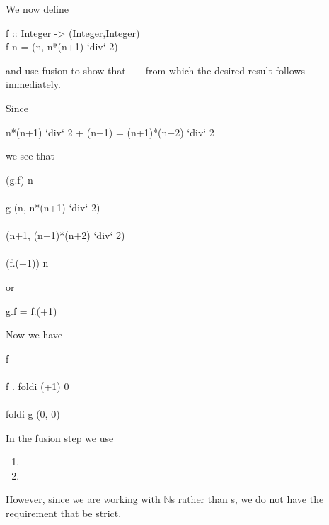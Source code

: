 \documentclass{seminar}
\newcommand{\NAT}{\textcolor{MathColor}{\ensuremath{\mathbb{N}}}}
\begin{document}
\begin{slide}
We now define

\begin{code}
f :: Integer -> (Integer,Integer)\\
f n = (n, n*(n+1) `div` 2)
\end{code}

and use fusion to show that ~  ~ from which the
desired result follows immediately.

\newslide


Since

\begin{code}
n*(n+1) `div` 2 + (n+1) = (n+1)*(n+2) `div` 2
\end{code}

we see that

\begin{code}
(g.f) n\\
\\
g (n, n*(n+1) `div` 2)\\
\\
(n+1, (n+1)*(n+2) `div` 2)\\
\\
(f.(+1)) n
\end{code}

or

\begin{code}
g.f = f.(+1)
\end{code}

\newslide

Now we have

\begin{code}
f\\
\\
f . foldi (+1) 0\\
\\
foldi g (0, 0)
\end{code}

In the fusion step we use
\begin{enumerate}
\item {}
\item {}
\end{enumerate}

However, since we are working with \NAT s rather than s,
we do not have the requirement that  be strict.


\end{slide}
\end{document}
